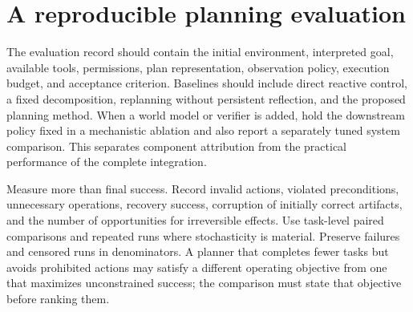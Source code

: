 \section{A reproducible planning evaluation}
\label{sec:C10:evaluation}
The evaluation record should contain the initial environment, interpreted goal, available tools, permissions, plan representation, observation policy, execution budget, and acceptance criterion. Baselines should include direct reactive control, a fixed decomposition, replanning without persistent reflection, and the proposed planning method. When a world model or verifier is added, hold the downstream policy fixed in a mechanistic ablation and also report a separately tuned system comparison. This separates component attribution from the practical performance of the complete integration.

Measure more than final success. Record invalid actions, violated preconditions, unnecessary operations, recovery success, corruption of initially correct artifacts, and the number of opportunities for irreversible effects. Use task-level paired comparisons and repeated runs where stochasticity is material. Preserve failures and censored runs in denominators. A planner that completes fewer tasks but avoids prohibited actions may satisfy a different operating objective from one that maximizes unconstrained success; the comparison must state that objective before ranking them.


